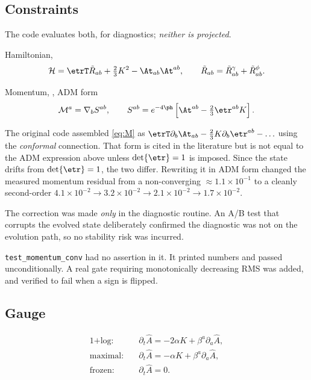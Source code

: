 \subsection{Constraints}

The code evaluates both, for diagnostics; \emph{neither is projected}.

Hamiltonian, 
\begin{equation}
\label{eq:H}
\mathcal{H} = \etrT\tilde{R}_{ab}
  + \tfrac{2}{3}K^2 - \At_{ab}\At^{ab},
\qquad
\tilde{R}_{ab} = \tilde{R}^{\gamma}_{ab} + \tilde{R}^{\phi}_{ab}.
\end{equation}

Momentum, , ADM form
\begin{equation}
\label{eq:M}
\mathcal{M}^a = \nabla_b S^{ab},
\qquad
S^{ab} = e^{-4\ph}\left[\At^{ab} - \tfrac{2}{3}\etr^{ab}K\right].
\end{equation}

\gotcha
The original code assembled \eqref{eq:M} as $\etrT\partial_b\At_{ab} -
\frac{2}{3}K\partial_b\etr^{ab} - \ldots$ using the \emph{conformal}
connection. That form is cited in the literature but is not equal to the ADM
expression above unless $\det\etr = 1$ is imposed. Since the state drifts from
$\det\etr = 1$, the two differ. Rewriting it in ADM form changed the measured
momentum residual from a non-converging $\approx 1.1\times10^{-1}$ to a
cleanly second-order $4.1\times10^{-2} \to 3.2\times10^{-2} \to 2.1\times10^{-2}
\to 1.7\times10^{-2}$.

The correction was made \emph{only} in the diagnostic routine. An A/B test that
corrupts the evolved state deliberately confirmed the diagnostic was not on the
evolution path, so no stability risk was incurred.

\gotcha
\texttt{test\_momentum\_conv} had no assertion in it. It printed numbers and
passed unconditionally. A real gate requiring monotonically decreasing RMS was
added, and verified to fail when a sign is flipped.

\subsection{Gauge}

\begin{align}
\text{1+log:} \quad &\partial_t\hat{A}
  = -2\alpha K + \beta^a\partial_a\hat{A},
  \label{eq:slice-log}\\
\text{maximal:} \quad &\partial_t\hat{A}
  = -\alpha K + \beta^a\partial_a\hat{A},
  \label{eq:slice-max}\\
\text{frozen:} \quad &\partial_t\hat{A} = 0.
  \label{eq:slice-frozen}
\end{align}

